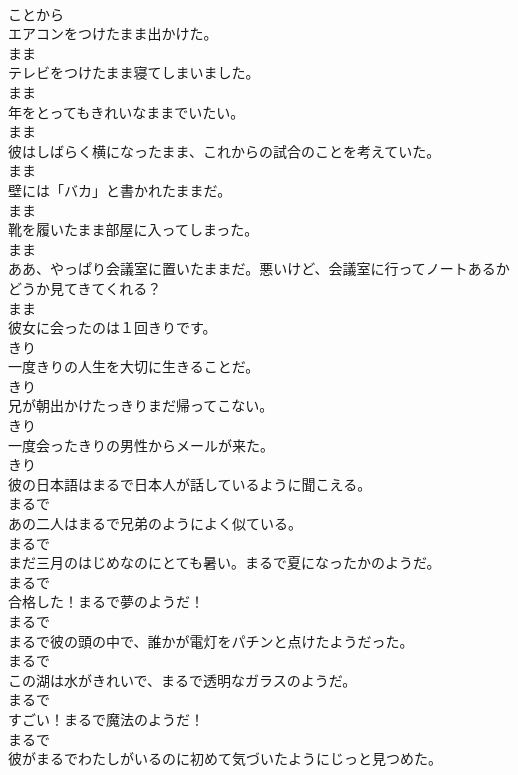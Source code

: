\documentclass[8pt]{extreport}
\begin{document}
\begin{CJK}{UTF8}{min}
\\	ことから
\\	エアコンをつけたまま出かけた。	
\\	まま
\\	テレビをつけたまま寝てしまいました。	
\\	まま
\\	年をとってもきれいなままでいたい。	
\\	まま
\\	彼はしばらく横になったまま、これからの試合のことを考えていた。	
\\	まま
\\	壁には「バカ」と書かれたままだ。	
\\	まま
\\	靴を履いたまま部屋に入ってしまった。	
\\	まま
\\	ああ、やっぱり会議室に置いたままだ。悪いけど、会議室に行ってノートあるかどうか見てきてくれる？	
\\	まま
\\	彼女に会ったのは１回きりです。	
\\	きり
\\	一度きりの人生を大切に生きることだ。	
\\	きり
\\	兄が朝出かけたっきりまだ帰ってこない。	
\\	きり
\\	一度会ったきりの男性からメールが来た。	
\\	きり
\\	彼の日本語はまるで日本人が話しているように聞こえる。	
\\	まるで
\\	あの二人はまるで兄弟のようによく似ている。	
\\	まるで
\\	まだ三月のはじめなのにとても暑い。まるで夏になったかのようだ。	
\\	まるで
\\	合格した！まるで夢のようだ！	
\\	まるで
\\	まるで彼の頭の中で、誰かが電灯をパチンと点けたようだった。	
\\	まるで
\\	この湖は水がきれいで、まるで透明なガラスのようだ。	
\\	まるで
\\	すごい！まるで魔法のようだ！	
\\	まるで
\\	彼がまるでわたしがいるのに初めて気づいたようにじっと見つめた。	

\end{CJK}
\end{document}
